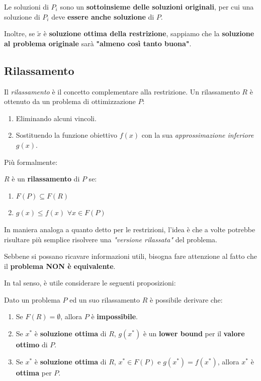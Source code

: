 \begin{remark}[INTUIZIONE]
    Le soluzioni di $P_i$ sono un \textbf{sottoinsieme delle soluzioni originali},
    per cui una soluzione di $P_i$ deve \textbf{essere anche soluzione} di $P$.

    Inoltre, se $\tilde{x}$ è \textbf{soluzione ottima della restrizione}, sappiamo
    che la \textbf{soluzione al problema originale} sarà \textbf{"almeno così
    tanto buona"}.
\end{remark}

\subsection{Rilassamento}

Il \textit{rilassamento} è il concetto complementare alla restrizione. Un 
rilassamento $R$ è ottenuto da un problema di ottimizzazione $P$:
\begin{enumerate}
    \item Eliminando alcuni vincoli.
    \item Sostituendo la funzione obiettivo $f(x)$ con la sua \textit{approssimazione
        inferiore} $g(x)$.
\end{enumerate}

Più formalmente:

\begin{definition}[RILASSAMENTO]
    $R$ è un \textbf{rilassamento} di $P$ se:
    \begin{enumerate}
        \item $F(P) \subseteq F(R)$
        \item $g(x)\le f(x)$  $\forall x\in F(P)$
    \end{enumerate}
\end{definition}

In maniera analoga a quanto detto per le restrizioni, l'idea è che a volte 
potrebbe risultare più semplice risolvere una \textit{"versione rilassata"} del
problema.

\begin{warn}
    Sebbene si possano ricavare informazioni utili, bisogna fare attenzione 
    al fatto che il \textbf{problema NON è equivalente}.
\end{warn}

In tal senso, è utile considerare le seguenti proposizioni:

\begin{prop}
    Dato un problema $P$ ed un suo rilassamento $R$ è possibile derivare che:
    \begin{enumerate}
        \item Se $F(R)=\emptyset$, allora $P$ è \textbf{impossibile}.
        \item Se $x^*$ è \textbf{soluzione ottima} di $R$, $g(x^*)$ è un \textbf{lower
            bound} per il \textbf{valore ottimo} di $P$.
        \item Se $x^*$ è \textbf{soluzione ottima} di $R$, $x^*\in F(P)$ e
            $g(x^*)=f(x^*)$, allora $x^*$ è \textbf{ottima} per $P$.
    \end{enumerate}
\end{prop}

